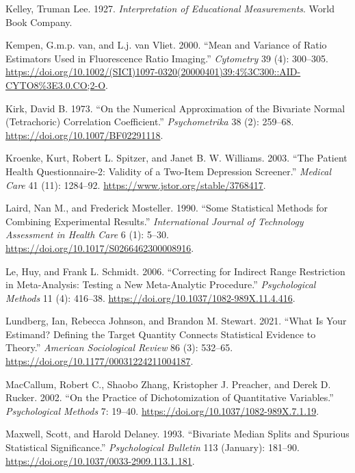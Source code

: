 \documentclass[
  letterpaper,
  DIV=11,
  numbers=noendperiod]{scrreprt}
\newlength{\cslhangindent}
\newlength{\cslentryspacingunit} %
\newenvironment{CSLReferences}[2] %
 {%
  \setlength{\parindent}{0pt}
  \ifodd #1
  \let\oldpar\par
  \def\par{\hangindent=\cslhangindent\oldpar}
  \fi
  \setlength{\parskip}{#2\cslentryspacingunit}
 }%
 {}
\begin{document}
\begin{CSLReferences}{1}{0}
\leavevmode{}%
Kelley, Truman Lee. 1927. \emph{Interpretation of Educational
Measurements}. World Book Company.

\leavevmode{}%
Kempen, G.m.p. van, and L.j. van Vliet. 2000. {``Mean and Variance of
Ratio Estimators Used in Fluorescence Ratio Imaging.''} \emph{Cytometry}
39 (4): 300--305.
\url{https://doi.org/10.1002/(SICI)1097-0320(20000401)39:4\%3C300::AID-CYTO8\%3E3.0.CO;2-O}.

\leavevmode{}%
Kirk, David B. 1973. {``On the Numerical Approximation of the Bivariate
Normal (Tetrachoric) Correlation Coefficient.''} \emph{Psychometrika} 38
(2): 259--68. \url{https://doi.org/10.1007/BF02291118}.

\leavevmode{}%
Kroenke, Kurt, Robert L. Spitzer, and Janet B. W. Williams. 2003. {``The
Patient Health Questionnaire-2: Validity of a Two-Item Depression
Screener.''} \emph{Medical Care} 41 (11): 1284--92.
\url{https://www.jstor.org/stable/3768417}.

\leavevmode{}%
Laird, Nan M., and Frederick Mosteller. 1990. {``Some Statistical
Methods for Combining Experimental Results.''} \emph{International
Journal of Technology Assessment in Health Care} 6 (1): 5--30.
\url{https://doi.org/10.1017/S0266462300008916}.

\leavevmode{}%
Le, Huy, and Frank L. Schmidt. 2006. {``Correcting for Indirect Range
Restriction in Meta-Analysis: Testing a New Meta-Analytic Procedure.''}
\emph{Psychological Methods} 11 (4): 416--38.
\url{https://doi.org/10.1037/1082-989X.11.4.416}.

\leavevmode{}%
Lundberg, Ian, Rebecca Johnson, and Brandon M. Stewart. 2021. {``What Is
Your Estimand? Defining the Target Quantity Connects Statistical
Evidence to Theory.''} \emph{American Sociological Review} 86 (3):
532--65. \url{https://doi.org/10.1177/00031224211004187}.

\leavevmode{}%
MacCallum, Robert C., Shaobo Zhang, Kristopher J. Preacher, and Derek D.
Rucker. 2002. {``On the Practice of Dichotomization of Quantitative
Variables.''} \emph{Psychological Methods} 7: 19--40.
\url{https://doi.org/10.1037/1082-989X.7.1.19}.

\leavevmode{}%
Maxwell, Scott, and Harold Delaney. 1993. {``Bivariate Median Splits and
Spurious Statistical Significance.''} \emph{Psychological Bulletin} 113
(January): 181--90. \url{https://doi.org/10.1037/0033-2909.113.1.181}.


\end{CSLReferences}
\end{document}
